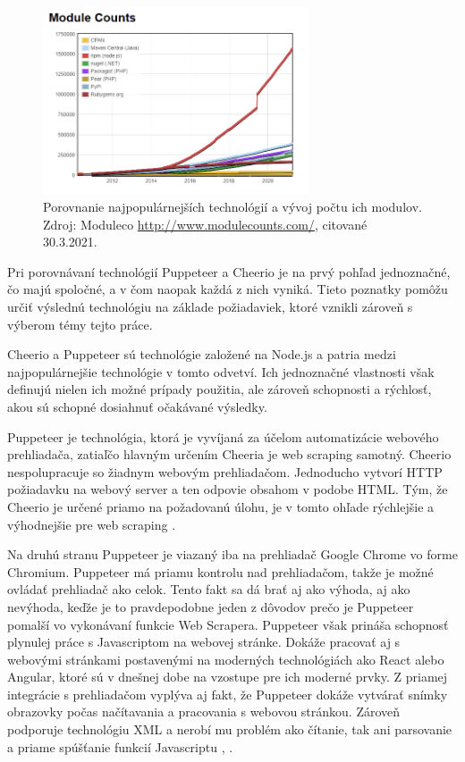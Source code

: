 \begin{figure}[hbt]
	\centering
	\includegraphics[width=0.7\textwidth]{obrazky-figures/modules.png}
	\caption{Porovnanie najpopulárnejších technológií a vývoj počtu ich modulov. Zdroj: Moduleco \url{http://www.modulecounts.com/}, citované 30.3.2021.}
	\label{Moduleco_img}
\end{figure}

\bigskip

Pri porovnávaní technológií Puppeteer a Cheerio je na prvý pohľad jednoznačné, čo majú spoločné, a v čom naopak každá z nich vyniká. Tieto poznatky pomôžu určiť výslednú technológiu na základe požiadaviek, ktoré vznikli zároveň s výberom témy tejto práce.

Cheerio a Puppeteer sú technológie založené na Node.js a patria medzi najpopulárnejšie technológie v tomto odvetví. Ich jednoznačné vlastnosti však definujú nielen ich možné prípady použitia, ale zároveň schopnosti a rýchlosť, akou sú schopné dosiahnuť očakávané výsledky. 

\newpage

Puppeteer je technológia, ktorá je vyvíjaná za účelom automatizácie webového prehliadača, zatiaľčo hlavným určením Cheeria je web scraping samotný. Cheerio nespolupracuje so žiadnym webovým prehliadačom. Jednoducho vytvorí HTTP požiadavku na webový server a ten odpovie obsahom v podobe HTML. Tým, že Cheerio je určené priamo na požadovanú úlohu, je v tomto ohľade rýchlejšie a výhodnejšie pre web scraping \cite{cheerio}.

Na druhú stranu Puppeteer je viazaný iba na prehliadač Google Chrome vo forme Chromium. Puppeteer má priamu kontrolu nad prehliadačom, takže je možné ovládať prehliadač ako celok. Tento fakt sa dá brať aj ako výhoda, aj ako nevýhoda, keďže je to pravdepodobne jeden z dôvodov prečo je Puppeteer pomalší vo vykonávaní funkcie Web Scrapera. Puppeteer však prináša schopnosť plynulej práce s Javascriptom na webovej stránke. Dokáže pracovať aj s webovými stránkami postavenými na moderných technológiách ako React alebo Angular, ktoré sú v dnešnej dobe na vzostupe pre ich moderné prvky. Z priamej integrácie s prehliadačom vyplýva aj fakt, že Puppeteer dokáže vytvárať snímky obrazovky počas načítavania a pracovania s webovou stránkou. Zároveň podporuje technológiu XML a nerobí mu problém ako čítanie, tak ani parsovanie a priame spúšťanie funkcií Javascriptu \cite{puppeteer}, \cite{cheerio}. 

